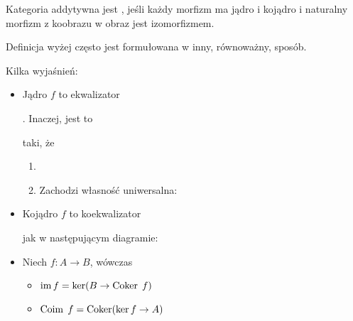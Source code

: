\begin{definition}
  Kategoria addytywna jest , jeśli każdy morfizm ma jądro i kojądro i naturalny morfizm z koobrazu w obraz jest izomorfizmem.
\end{definition}

Definicja wyżej często jest formułowana w inny, równoważny, sposób.

Kilka wyjaśnień:
\begin{itemize}
  \item Jądro $f$ to ekwalizator . Inaczej, jest to  taki, że
    \begin{enumerate}
      \item {}
      \item Zachodzi własność uniwersalna:
        \begin{center}\end{center}
    \end{enumerate}
  \item Kojądro $f$ to koekwalizator  jak w następującym diagramie:
    \begin{center}\end{center}
  \item Niech $f:A\to B$, wówczas
    \begin{itemize}
      \item $\operatorname{im} f=\ker(B\to \operatorname{Coker}\;f)$
      \item $\operatorname{Coim}\;f=\operatorname{Coker}(\ker f\to A)$
    \end{itemize}

    \begin{center}\end{center}
\end{itemize}

